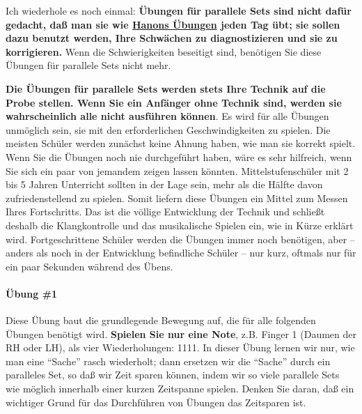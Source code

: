 Ich wiederhole es noch einmal: \textbf{Übungen für parallele Sets sind nicht dafür gedacht, daß man sie wie \hyperref[c1iii7h]{Hanons Übungen} jeden Tag übt; sie sollen dazu benutzt werden, Ihre Schwächen zu diagnostizieren und sie zu korrigieren.}
Wenn die Schwierigkeiten beseitigt sind, benötigen Sie diese Übungen für parallele Sets nicht mehr.

\textbf{Die Übungen für parallele Sets werden stets Ihre Technik auf die Probe stellen.
Wenn Sie ein Anfänger ohne Technik sind, werden sie wahrscheinlich alle nicht ausführen können}.
Es wird für alle Übungen unmöglich sein, sie mit den erforderlichen Geschwindigkeiten zu spielen.
Die meisten Schüler werden zunächst keine Ahnung haben, wie man sie korrekt spielt.
Wenn Sie die Übungen noch nie durchgeführt haben, wäre es sehr hilfreich, wenn Sie sich ein paar von jemandem zeigen lassen könnten.
Mittelstufenschüler mit 2 bis 5 Jahren Unterricht sollten in der Lage sein, mehr als die Hälfte davon zufriedenstellend zu spielen.
Somit liefern diese Übungen ein Mittel zum Messen Ihres Fortschritts.
Das ist die völlige Entwicklung der Technik und schließt deshalb die Klangkontrolle und das musikalische Spielen ein, wie in Kürze erklärt wird.
Fortgeschrittene Schüler werden die Übungen immer noch benötigen, aber -- anders als noch in der Entwicklung befindliche Schüler -- nur kurz, oftmals nur für ein paar Sekunden während des Übens.


\paragraph{Übung \#1}
\label{c1iii7b1}

Diese Übung baut die grundlegende Bewegung auf, die für alle folgenden Übungen benötigt wird.
\textbf{Spielen Sie nur eine Note}, z.B. Finger 1 (Daumen der RH oder LH), als vier Wiederholungen: 1111.
In dieser Übung lernen wir nur, wie man eine \enquote{Sache} rasch wiederholt; dann ersetzen wir die \enquote{Sache} durch ein paralleles Set, so daß wir Zeit sparen können, indem wir so viele parallele Sets wie möglich innerhalb einer kurzen Zeitspanne spielen.
Denken Sie daran, daß ein wichtiger Grund für das Durchführen von Übungen das Zeitsparen ist.

